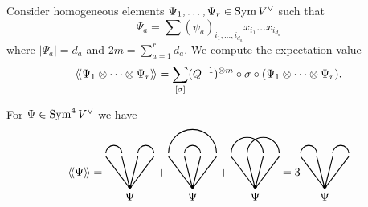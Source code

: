 Consider homogeneous elements $\Psi_1, \dots, \Psi_r \in \operatorname{Sym} V^\vee$ such that
\begin{equation*}
  \Psi_a = \sum (\psi_a)_{i_1, \dots, i_{d_a}} x_{i_1} \dots x_{i_{d_a}}
\end{equation*}
where $|\Psi_a| = d_a$ and $2m = \sum_{a = 1}^r d_a$. We compute the expectation value
\begin{equation*}
  \langle \! \langle {\Psi_1 \otimes \dots \otimes \Psi_r} \rangle \! \rangle
  = \sum_{[\sigma]} (Q^{-1})^{\otimes m} \circ \sigma \circ (\Psi_1 \otimes \dots \otimes \Psi_r ).
\end{equation*}
\begin{example}
  For $\Psi \in \operatorname{Sym}^4 V^\vee$ we have
  \begin{equation*}
    \avg{\Psi}
    =
    \begin{tikzpicture}[scale=.5, baseline=4mm]
      \draw[fill=black] (1.5, .1) circle (1mm);
      \draw[thick] (1.5, 0) node[anchor=north] {$\Psi$} -- (0, 2);
      \draw[thick] (1.5, 0) -- (1, 2);
      \draw[thick] (1.5, 0) -- (2, 2);
      \draw[thick] (1.5, 0) -- (3, 2);
      \draw[thick] (0, 2.2) arc (180:0:.5);
      \draw[thick] (2, 2.2) arc (180:0:.5);
    \end{tikzpicture}
    +
    \begin{tikzpicture}[scale=.5, baseline=4mm]
      \draw[fill=black] (1.5, .1) circle (1mm);
      \draw[thick] (1.5, 0) node[anchor=north] {$\Psi$} -- (0, 2);
      \draw[thick] (1.5, 0) -- (1, 2);
      \draw[thick] (1.5, 0) -- (2, 2);
      \draw[thick] (1.5, 0) -- (3, 2);
      \draw[thick] (0, 2.2) arc (180:0:1.5);
      \draw[thick] (1, 2.2) arc (180:0:.5);
    \end{tikzpicture}
    +
    \begin{tikzpicture}[scale=.5, baseline=4mm]
      \draw[fill=black] (1.5, .1) circle (1mm);
      \draw[thick] (1.5, 0) node[anchor=north] {$\Psi$} -- (0, 2);
      \draw[thick] (1.5, 0) -- (1, 2);
      \draw[thick] (1.5, 0) -- (2, 2);
      \draw[thick] (1.5, 0) -- (3, 2);
      \draw[thick] (0, 2.2) arc (180:0:1);
      \draw[thick] (1, 2.2) arc (180:0:1);
    \end{tikzpicture}
    = 3
    \begin{tikzpicture}[scale=.5, baseline=4mm]
      \draw[fill=black] (1.5, .1) circle (1mm);
      \draw[thick] (1.5, 0) node[anchor=north] {$\Psi$} -- (0, 2);
      \draw[thick] (1.5, 0) -- (1, 2);
      \draw[thick] (1.5, 0) -- (2, 2);
      \draw[thick] (1.5, 0) -- (3, 2);
      \draw[thick] (0, 2.2) arc (180:0:.5);
      \draw[thick] (2, 2.2) arc (180:0:.5);
    \end{tikzpicture}
  \end{equation*}
\end{example}

